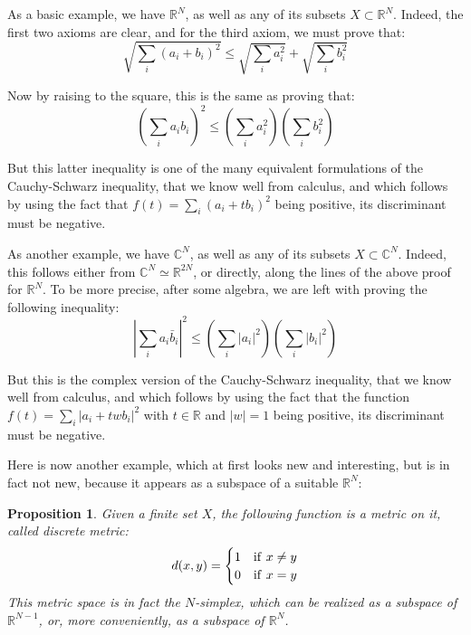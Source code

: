 \documentclass[12pt]{amsbook}
\newtheorem{proposition}[theorem]{Proposition}
\begin{document}
As a basic example, we have $\mathbb R^N$, as well as any of its subsets $X\subset\mathbb R^N$. Indeed, the first two axioms are clear, and for the third axiom, we must prove that:
$$\sqrt{\sum_i(a_i+b_i)^2}\leq\sqrt{\sum_i a_i^2}+\sqrt{\sum_i b_i^2}$$

Now by raising to the square, this is the same as proving that:
$$\left(\sum_ia_ib_i\right)^2\leq\left(\sum_ia_i^2\right)\left(\sum_ib_i^2\right)$$

But this latter inequality is one of the many equivalent formulations of the Cauchy-Schwarz inequality, that we know well from calculus, and which follows by using the fact that $f(t)=\sum_i(a_i+tb_i)^2$ being positive, its discriminant must be negative.

\bigskip

As another example, we have $\mathbb C^N$, as well as any of its subsets $X\subset\mathbb C^N$. Indeed, this follows either from $\mathbb C^N\simeq\mathbb R^{2N}$, or directly, along the lines of the above proof for $\mathbb R^N$. To be more precise, after some algebra, we are left with proving the following inequality:
$$\left|\sum_ia_i\bar{b}_i\right|^2\leq\left(\sum_i|a_i|^2\right)\left(\sum_i|b_i|^2\right)$$

But this is the complex version of the Cauchy-Schwarz inequality, that we know well from calculus, and which follows by using the fact that the function $f(t)=\sum_i|a_i+twb_i|^2$ with $t\in\mathbb R$ and $|w|=1$ being positive, its discriminant must be negative.

\bigskip

Here is now another example, which at first looks new and interesting, but is in fact not new, because it appears as a subspace of a suitable $\mathbb R^N$:

\begin{proposition}
Given a finite set $X$, the following function is a metric on it, called discrete metric:
$$d(x,y)=\begin{cases}
1&{\rm if}\ x\neq y\\
0&{\rm if}\ x=y
\end{cases}$$
This metric space is in fact the $N$-simplex, which can be realized as a subspace of $\mathbb R^{N-1}$, or, more conveniently, as a subspace of $\mathbb R^N$. 
\end{proposition}
\end{document}
